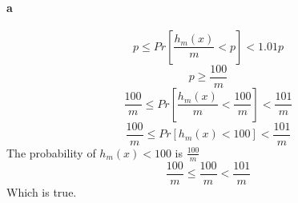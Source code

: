 \paragraph{a}
\begin{equation*}
    p \le Pr\left[ \frac{h_{m}(x)}{m} < p \right] < 1.01p
\end{equation*}
\begin{equation*}
    p \ge \frac{100}{m}
\end{equation*}
\begin{equation*}
    \frac{100}{m} \le Pr\left[ \frac{h_{m}(x)}{m} < \frac{100}{m} \right] < \frac{101}{m}
\end{equation*}
\begin{equation*}
    \frac{100}{m} \le Pr\left[ h_{m}(x) < 100 \right] < \frac{101}{m}
\end{equation*}
The probability of $h_m(x) < 100$ is $\frac{100}{m}$
\begin{equation*}
    \frac{100}{m} \le \frac{100}{m} < \frac{101}{m}
\end{equation*}
Which is true.

